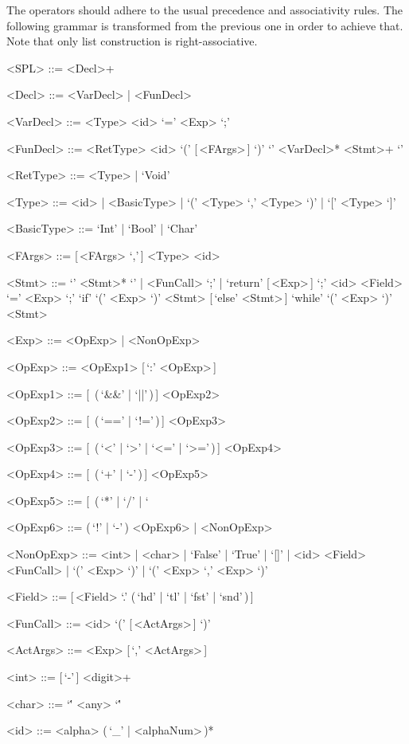\documentclass{article}
\begin{document}
The operators should adhere to the usual precedence and associativity rules.
The following grammar is transformed from the previous one in order to achieve that.
Note that only list construction is right-associative.
\setlength{\grammarindent}{7.1em}
\begin{grammar}
    <SPL> ::= <Decl>+

    <Decl> ::= <VarDecl> | <FunDecl>

    <VarDecl> ::= <Type> <id> `=' <Exp> `;'

    <FunDecl> ::= <RetType> <id> `(' [\,<FArgs>\,] `)' `{' <VarDecl>* <Stmt>+ `}'

    <RetType> ::= <Type> | `Void'

    <Type> ::= <id> | <BasicType> | `(' <Type> `,' <Type> `)' | `[' <Type> `]'

    <BasicType> ::= `Int' | `Bool' | `Char'

    <FArgs> ::= [\,<FArgs> `,'\,] <Type> <id>

    <Stmt> ::= `{' <Stmt>* `}' | <FunCall> `;' | `return' [\,<Exp>\,] `;'
    \alt <id> <Field> `=' <Exp> `;'
    \alt `if' `(' <Exp> `)' <Stmt> [\,`else' <Stmt>\,]
    \alt `while' `(' <Exp> `)' <Stmt>

    <Exp> ::= <OpExp> | <NonOpExp>

    <OpExp> ::= <OpExp1> [\,`:' <OpExp>\,]

    <OpExp1> ::= [\,<OpExp1> (\,`&&' | `||'\,)\,] <OpExp2>

    <OpExp2> ::= [\,<OpExp2> (\,`==' | `!='\,)\,] <OpExp3>

    <OpExp3> ::= [\,<OpExp3> (\,`<' | `>' | `<=' | `>='\,)\,] <OpExp4>

    <OpExp4> ::= [\,<OpExp4> (\,`+' | `-'\,)\,] <OpExp5>

    <OpExp5> ::= [\,<OpExp5> (\,`*' | `/' | `%

    <OpExp6> ::= (\,`!' | `-'\,) <OpExp6> | <NonOpExp>

    <NonOpExp> ::= <int> | <char> | `False' | `True' | `[]' | <id> <Field>
    \alt <FunCall> | `(' <Exp> `)' | `(' <Exp> `,' <Exp> `)'

    <Field> ::= [\,<Field> `.' (\,`hd' | `tl' | `fst' | `snd'\,)\,]

    <FunCall> ::= <id> `(' [\,<ActArgs>\,] `)'

    <ActArgs> ::= <Exp> [\,`,' <ActArgs>\,]

    <int> ::= [\,`-'\,] <digit>+

    <char> ::= `\'' <any> `\''

    <id> ::= <alpha> (\,`_' | <alphaNum>\,)*
\end{grammar}
\end{document}
